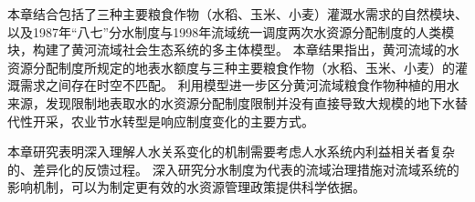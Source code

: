 本章结合包括了三种主要粮食作物（水稻、玉米、小麦）灌溉水需求的自然模块、以及1987年``八七''分水制度与1998年流域统一调度两次水资源分配制度的人类模块，构建了黄河流域社会\textendash{}生态系统的多主体模型。
本章结果指出，黄河流域的水资源分配制度所规定的地表水额度与三种主要粮食作物（水稻、玉米、小麦）的灌溉需求之间存在时空不匹配。
利用模型进一步区分黄河流域粮食作物种植的用水来源，发现限制地表取水的水资源分配制度限制并没有直接导致大规模的地下水替代性开采，农业节水转型是响应制度变化的主要方式。

本章研究表明深入理解人\textendash{}水关系变化的机制需要考虑人\textendash{}水系统内利益相关者复杂的、差异化的反馈过程。
深入研究分水制度为代表的流域治理措施对流域系统的影响机制，可以为制定更有效的水资源管理政策提供科学依据。
